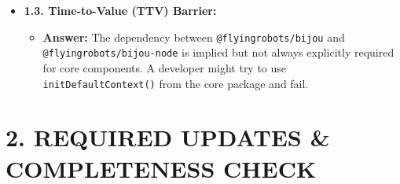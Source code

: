 \begin{itemize}
\begin{itemize}
\begin{itemize}
      \begin{enumerate}
      \def\labelenumi{\arabic{enumi}.}
      \tightlist
      \item
        \textbf{``How do I start?''}: Yes (Quick Start in README).
      \item
        \textbf{``How do I scale?''}: Yes (Sub-Apps and App Frame docs).
      \item
        \textbf{``How is it different?''}: Yes (``Why Bijou?'' section).
      \end{enumerate}
    \end{itemize}
  \end{itemize}
\item
  \textbf{1.3. Time-to-Value (TTV) Barrier:}

  \begin{itemize}
  \tightlist
  \item
    \textbf{Answer:} The dependency between \texttt{@\allowbreak{}f\allowbreak{}l\allowbreak{}y\allowbreak{}i\allowbreak{}n\allowbreak{}g\allowbreak{}r\allowbreak{}o\allowbreak{}b\allowbreak{}o\allowbreak{}t\allowbreak{}s\allowbreak{}/\allowbreak{}b\allowbreak{}i\allowbreak{}j\allowbreak{}o\allowbreak{}u} and \texttt{@\allowbreak{}f\allowbreak{}l\allowbreak{}y\allowbreak{}i\allowbreak{}n\allowbreak{}g\allowbreak{}r\allowbreak{}o\allowbreak{}b\allowbreak{}o\allowbreak{}t\allowbreak{}s\allowbreak{}/\allowbreak{}b\allowbreak{}i\allowbreak{}j\allowbreak{}o\allowbreak{}u\allowbreak{}-\allowbreak{}n\allowbreak{}o\allowbreak{}d\allowbreak{}e} is implied but not always explicitly required for core components. A developer might try to use \texttt{i\allowbreak{}n\allowbreak{}i\allowbreak{}t\allowbreak{}D\allowbreak{}e\allowbreak{}f\allowbreak{}a\allowbreak{}u\allowbreak{}l\allowbreak{}t\allowbreak{}C\allowbreak{}o\allowbreak{}n\allowbreak{}t\allowbreak{}e\allowbreak{}x\allowbreak{}t\allowbreak{}(\allowbreak{})} from the core package and fail.
  \end{itemize}
\end{itemize}

\section{2. REQUIRED UPDATES \& COMPLETENESS CHECK}\label{record-414-required-updates-completeness-check}

